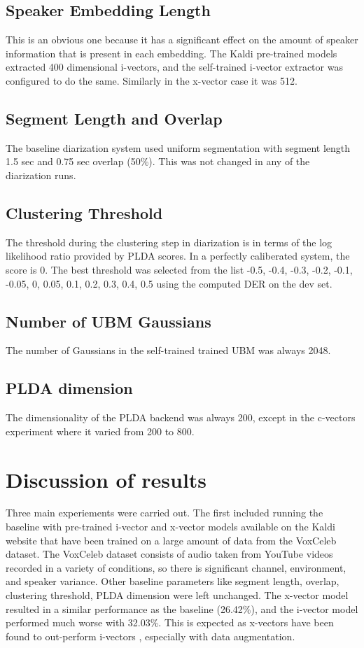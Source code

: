 		\subsection{Speaker Embedding Length}
			This is an obvious one because it has a significant effect on the amount of speaker information that is present in each embedding. The Kaldi pre-trained models extracted 400 dimensional i-vectors, and the self-trained i-vector extractor was configured to do the same. Similarly in the x-vector case it was 512.
		\subsection{Segment Length and Overlap}
		The baseline diarization system used uniform segmentation with segment length 1.5 sec and 0.75 sec overlap (50\%). This was not changed in any of the diarization runs.
		\subsection{Clustering Threshold}
		The threshold during the clustering step in diarization is in terms of the log likelihood ratio provided by PLDA scores. In a perfectly caliberated system, the score is 0. The best threshold was selected from the list -0.5, -0.4, -0.3, -0.2, -0.1, -0.05, 0, 0.05, 0.1, 0.2, 0.3, 0.4, 0.5 using the computed DER on the dev set.
		\subsection{Number of UBM Gaussians}
		The number of Gaussians in the self-trained trained UBM was always 2048.
		\subsection{PLDA dimension}
		The dimensionality of the PLDA backend was always 200, except in the c-vectors experiment where it varied from 200 to 800.

	\section{Discussion of results}
		Three main experiements were carried out. The first included running the baseline with pre-trained i-vector and x-vector models available on the Kaldi website that have been trained on a large amount of data from the VoxCeleb dataset. The VoxCeleb dataset consists of audio taken from YouTube videos recorded in a variety of conditions, so there is significant channel, environment, and speaker variance. Other baseline parameters like segment length, overlap, clustering threshold, PLDA dimension were left unchanged. The x-vector model resulted in a similar performance as the baseline (26.42\%), and the i-vector model performed much worse with 32.03\%. This is expected as x-vectors have been found to out-perform i-vectors \cite{snyder2018x}, especially with data augmentation.
		
